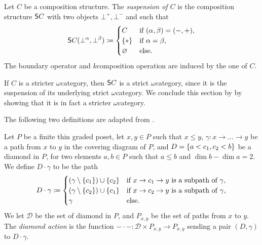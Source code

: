 \begin{dfn} [Suspension]
    Let \( C \) be a composition structure.
    The \emph{suspension of \( C \)} is the composition structure \( \mathsf{S}{C} \) with two objects \( \bot^+, \bot^- \) and such that
    \begin{equation*}
        \mathsf{S}{C}(\bot^\alpha, \bot^\beta) \coloneqq 
        \begin{cases}
            C       & \text{if } (\alpha, \beta) = (-, +),\\
            \left\{ {*} \right\} & \text{if } \alpha = \beta,\\
            \varnothing & \text{else.}
        \end{cases}
    \end{equation*}
    The boundary operator and \( k \)\nbd composition operation are induced by the one of \( C \). 
\end{dfn}

\noindent If \( C \) is a stricter \( \omega \)\nbd category, then \( \mathsf{S}{C} \) is a strict \( \omega \)\nbd category, since it is the suspension of its underlying strict \( \omega \)\nbd category.
We conclude this section by by showing that it is in fact a stricter \( \omega \)\nbd category. 

The following two definitions are adapted from \cite{chandler2019thin}.
\begin{dfn} 
    Let \( P \) be a finite thin graded poset, let \( x, y \in P \) such that \( x \le y \), \( \gamma \colon x \to \ldots \to y \) be a path from \( x \) to \( y \) in the covering diagram of \( P \), and \( D = \left\{ {a < c_1, c_2 < b} \right\} \) be a diamond in \( P \), for two elements \( a, b \in P \) such that \( a \le b \) and \( \dim b - \dim a = 2 \).
    We define \( D\cdot \gamma \) to be the path
    \begin{equation*}
        D \cdot \gamma \coloneqq 
        \begin{cases}
            (\gamma \setminus \left\{ {c_1} \right\}) \cup \left\{ {c_2} \right\} & \text{if } x \to c_1 \to y \text{ is a subpath of } \gamma, \\
            (\gamma \setminus \left\{ {c_2} \right\}) \cup \left\{ {c_1} \right\} & \text{if } x \to c_2 \to y \text{ is a subpath of } \gamma, \\
            \gamma & \text{else.}
        \end{cases}
    \end{equation*} 
    We let \( \mathcal{D} \) be the set of diamond in \( P \), and \( P_{x, y} \) be the set of paths from \( x \) to \( y \).
    The \emph{diamond action} is the function \( - \cdot - \colon \mathcal{D} \times P_{x, y} \to P_{x, y} \) sending a pair \( (D, \gamma) \) to \( D \cdot \gamma \).
\end{dfn}

